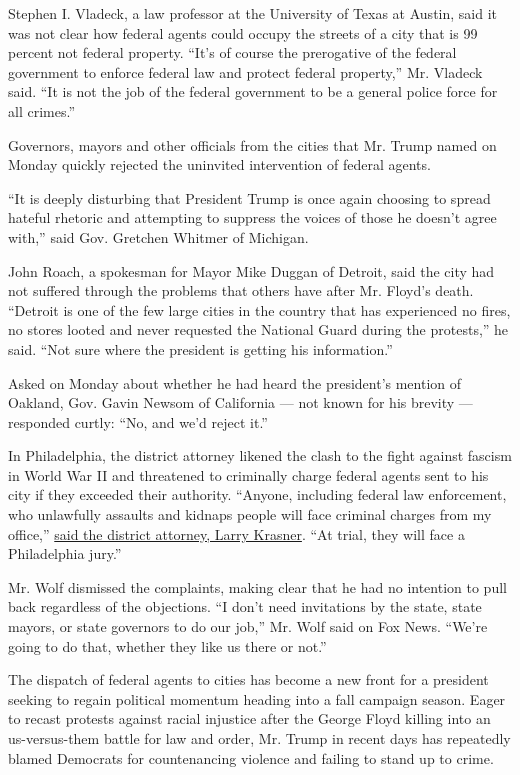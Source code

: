Stephen I. Vladeck, a law professor at the University of Texas at
Austin, said it was not clear how federal agents could occupy the
streets of a city that is 99 percent not federal property. ``It's of
course the prerogative of the federal government to enforce federal law
and protect federal property,'' Mr. Vladeck said. ``It is not the job of
the federal government to be a general police force for all crimes.''

Governors, mayors and other officials from the cities that Mr. Trump
named on Monday quickly rejected the uninvited intervention of federal
agents.

``It is deeply disturbing that President Trump is once again choosing to
spread hateful rhetoric and attempting to suppress the voices of those
he doesn't agree with,'' said Gov. Gretchen Whitmer of Michigan.

John Roach, a spokesman for Mayor Mike Duggan of Detroit, said the city
had not suffered through the problems that others have after Mr. Floyd's
death. ``Detroit is one of the few large cities in the country that has
experienced no fires, no stores looted and never requested the National
Guard during the protests,'' he said. ``Not sure where the president is
getting his information.''

Asked on Monday about whether he had heard the president's mention of
Oakland, Gov. Gavin Newsom of California --- not known for his brevity
--- responded curtly: ``No, and we'd reject it.''

In Philadelphia, the district attorney likened the clash to the fight
against fascism in World War II and threatened to criminally charge
federal agents sent to his city if they exceeded their authority.
``Anyone, including federal law enforcement, who unlawfully assaults and
kidnaps people will face criminal charges from my office,''
\href{https://twitter.com/AlexSilverman/status/1285309263347429376}{said
the district attorney, Larry Krasner}. ``At trial, they will face a
Philadelphia jury.''

Mr. Wolf dismissed the complaints, making clear that he had no intention
to pull back regardless of the objections. ``I don't need invitations by
the state, state mayors, or state governors to do our job,'' Mr. Wolf
said on Fox News. ``We're going to do that, whether they like us there
or not.''

The dispatch of federal agents to cities has become a new front for a
president seeking to regain political momentum heading into a fall
campaign season. Eager to recast protests against racial injustice after
the George Floyd killing into an us-versus-them battle for law and
order, Mr. Trump in recent days has repeatedly blamed Democrats for
countenancing violence and failing to stand up to crime.

